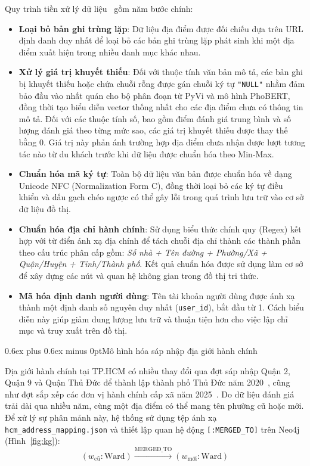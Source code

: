 \documentclass[journal,onecolumn,10pt]{IEEEtran}
\makeatletter
\newcommand{\code}[1]{\texttt{#1}}
\def\subsection{\@startsection{subsection}{2}{\z@}{1.8ex plus 1.0ex minus 0.3ex}%
{0.6ex plus 0.6ex minus 0pt}{\normalfont\normalsize\bfseries}}
\makeatother
\begin{document}
Quy trình tiền xử lý dữ liệu~\cite{r31} gồm năm bước chính:
\begin{itemize}
    \item \textbf{Loại bỏ bản ghi trùng lặp}: Dữ liệu địa điểm được đối chiếu dựa trên URL định danh duy nhất để loại bỏ các bản ghi trùng lặp phát sinh khi một địa điểm xuất hiện trong nhiều danh mục khác nhau.
    
    \item \textbf{Xử lý giá trị khuyết thiếu}: Đối với thuộc tính văn bản mô tả, các bản ghi bị khuyết thiếu hoặc chứa chuỗi rỗng được gán chuỗi ký tự \code{"NULL"} nhằm đảm bảo đầu vào nhất quán cho bộ phân đoạn từ PyVi và mô hình PhoBERT, đồng thời tạo biểu diễn vector thống nhất cho các địa điểm chưa có thông tin mô tả. Đối với các thuộc tính số, bao gồm điểm đánh giá trung bình và số lượng đánh giá theo từng mức sao, các giá trị khuyết thiếu được thay thế bằng $0$. Giá trị này phản ánh trường hợp địa điểm chưa nhận được lượt tương tác nào từ du khách trước khi dữ liệu được chuẩn hóa theo Min-Max.
    
    \item \textbf{Chuẩn hóa mã ký tự}: Toàn bộ dữ liệu văn bản được chuẩn hóa về dạng Unicode NFC (Normalization Form C), đồng thời loại bỏ các ký tự điều khiển và dấu gạch chéo ngược có thể gây lỗi trong quá trình lưu trữ vào cơ sở dữ liệu đồ thị.
    
    \item \textbf{Chuẩn hóa địa chỉ hành chính}: Sử dụng biểu thức chính quy (Regex) kết hợp với từ điển ánh xạ địa chính để tách chuỗi địa chỉ thành các thành phần theo cấu trúc phân cấp gồm: \textit{Số nhà + Tên đường + Phường/Xã + Quận/Huyện + Tỉnh/Thành phố}. Kết quả chuẩn hóa được sử dụng làm cơ sở để xây dựng các nút và quan hệ không gian trong đồ thị tri thức.
    
    \item \textbf{Mã hóa định danh người dùng}: Tên tài khoản người dùng được ánh xạ thành một định danh số nguyên duy nhất (\code{user\_id}), bắt đầu từ 1. Cách biểu diễn này giúp giảm dung lượng lưu trữ và thuận tiện hơn cho việc lập chỉ mục và truy xuất trên đồ thị.
\end{itemize}

\subsection{Mô hình hóa sáp nhập địa giới hành chính}

Địa giới hành chính tại TP.HCM có nhiều thay đổi qua đợt sáp nhập Quận 2, Quận 9 và Quận Thủ Đức để thành lập thành phố Thủ Đức năm 2020~\cite{r32}, cũng như đợt sắp xếp các đơn vị hành chính cấp xã năm 2025~\cite{r33}. Do dữ liệu đánh giá trải dài qua nhiều năm, cùng một địa điểm có thể mang tên phường cũ hoặc mới. Để xử lý sự phân mảnh này, hệ thống sử dụng tệp ánh xạ \code{hcm\_address\_mapping.json} và thiết lập quan hệ động \code{[:MERGED\_TO]} trên Neo4j (Hình~\ref{fig:kg}):
\begin{equation}
(w_{\text{cũ}}: \text{Ward}) \xrightarrow{\text{MERGED\_TO}} (w_{\text{mới}}: \text{Ward})
\end{equation}
\end{document}
